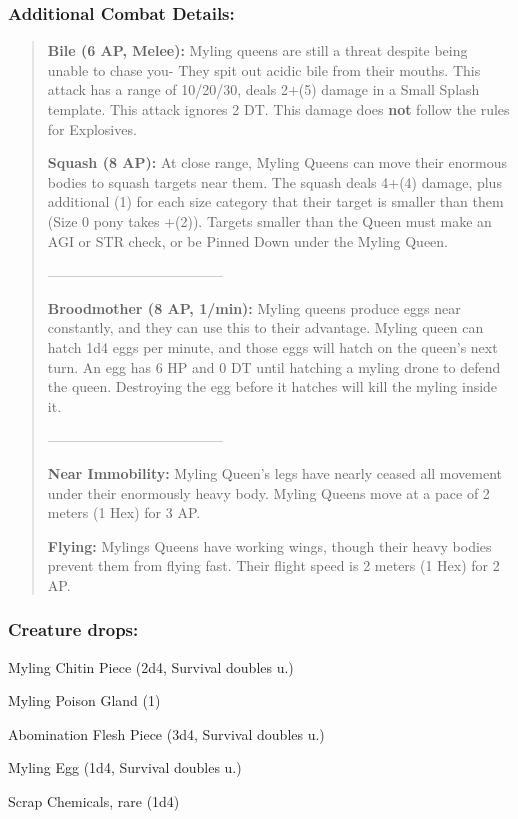 \documentclass[11pt,a4paper,twocolumn]{book}
\begin{document}
	\subsubsection*{Additional Combat Details:}
	\begin{verse}
		\textbf{Bile (6 AP, Melee):} Myling queens are still a threat despite being unable to chase you- They spit out acidic bile from their mouths. This attack has a range of 10/20/30, deals 2+(5) damage in a Small Splash template. This attack ignores 2 DT. This damage does \textbf{not} follow the rules for Explosives.
		
		\textbf{Squash (8 AP):} At close range, Myling Queens can move their enormous bodies to squash targets near them. The squash deals 4+(4) damage, plus additional (1) for each size category that their target is smaller than them (Size 0 pony takes +(2)). Targets smaller than the Queen must make an AGI or STR check, or be Pinned Down under the Myling Queen. 
		
		--------------------------------------
		
		\textbf{Broodmother (8 AP, 1/min):} Myling queens produce eggs near constantly, and they can use this to their advantage. Myling queen can hatch 1d4 eggs per minute, and those eggs will hatch on the queen's next turn. An egg has 6 HP and 0 DT until hatching a myling drone to defend the queen. Destroying the egg before it hatches will kill the myling inside it.
		
		--------------------------------------
	
		\textbf{Near Immobility:} Myling Queen's legs have nearly ceased all movement under their enormously heavy body. Myling Queens move at a pace of 2 meters (1 Hex) for 3 AP.
		
		\textbf{Flying:} Mylings Queens have working wings, though their heavy bodies prevent them from flying fast. Their flight speed is 2 meters (1 Hex) for 2 AP.
		
		
%		
	\end{verse}
	
	\subsubsection*{Creature drops:}
	\begin{compactitem}
		\item Myling Chitin Piece (2d4, Survival doubles u.)
		\item Myling Poison Gland (1)
		\item Abomination Flesh Piece (3d4, Survival doubles u.)
		\item Myling Egg (1d4, Survival doubles u.)
		\item Scrap Chemicals, rare (1d4)
	\end{compactitem}
	
\end{document}
